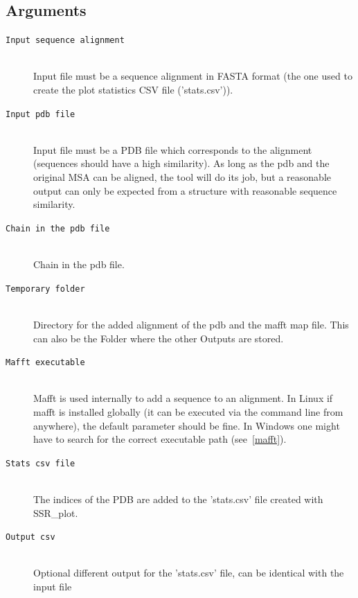 \documentclass[a4paper,10pt]{article}
\begin{document}
\subsection{Arguments}

\begin{description}

\item[\texttt{Input sequence alignment}] \hfill \\

Input file must be a sequence alignment in FASTA format (the one used to create the plot statistics CSV file ('stats.csv')).

\item[\texttt{Input pdb file}] \hfill \\

Input file must be a PDB file which corresponds to the alignment (sequences should have a high similarity).
As long as the pdb and the original MSA can be aligned, the tool will do its job, but a reasonable output can
only be expected from a structure with reasonable sequence similarity.

\item[\texttt{Chain in the pdb file}] \hfill \\

Chain in the pdb file.

\item[\texttt{Temporary folder}] \hfill \\

Directory for the added alignment of the pdb and the mafft map file. This can also be the Folder where the other Outputs are stored.

\item[\texttt{Mafft executable}] \hfill \\

Mafft is used internally to add a sequence to an alignment.
In Linux if mafft is installed globally (it can be executed via the command line from anywhere), the default parameter
should be fine. In Windows one might have to search for the correct executable path (see~\ref{mafft}). 

\item[\texttt{Stats csv file}] \hfill \\

The indices of the PDB are added to the 'stats.csv' file created with SSR\_plot.

\item[\texttt{Output csv}] \hfill \\

Optional different output for the 'stats.csv' file, can be identical with the input file

\end{description}
\end{document}
